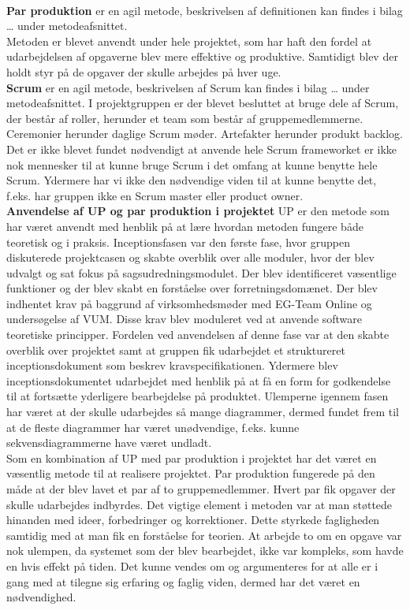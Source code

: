 \\
\textbf{Par produktion} er en agil metode, beskrivelsen af definitionen kan findes i bilag … under metodeafsnittet. \\
Metoden er blevet anvendt under hele projektet, som har haft den fordel at udarbejdelsen af opgaverne blev mere effektive og produktive. Samtidigt blev der holdt styr på de opgaver der skulle arbejdes på hver uge. 
\\ 
\textbf{Scrum} er en agil metode, beskrivelsen af Scrum kan findes i bilag … under metodeafsnittet.
I projektgruppen er der blevet besluttet at bruge dele af Scrum, der består af roller, herunder et team som består af gruppemedlemmerne. Ceremonier herunder daglige Scrum møder. Artefakter herunder produkt backlog. Det er ikke blevet fundet nødvendigt at anvende hele Scrum frameworket er ikke nok mennesker til at kunne bruge Scrum i det omfang at kunne benytte hele Scrum. Ydermere har vi ikke den nødvendige viden til at kunne benytte det, f.eks. har gruppen ikke en Scrum master eller product owner. \\
\textbf{Anvendelse af UP og par produktion i projektet}
UP er den metode som har været anvendt med henblik på at lære hvordan metoden fungere både teoretisk og i praksis. Inceptionsfasen var den første fase, hvor gruppen diskuterede projektcasen og skabte overblik over alle moduler, hvor der blev udvalgt og sat fokus på sagsudredningsmodulet. Der blev identificeret væsentlige funktioner og der blev skabt en forståelse over forretningsdomænet.  Der blev indhentet krav på baggrund af virksomhedsmøder med EG-Team Online og undersøgelse af VUM. Disse krav blev moduleret ved at anvende software teoretiske principper. Fordelen ved anvendelsen af denne fase var at den skabte overblik over projektet samt at gruppen fik udarbejdet et struktureret inceptionsdokument som beskrev kravspecifikationen. Ydermere blev inceptionsdokumentet udarbejdet med henblik på at få en form for godkendelse til at fortsætte yderligere bearbejdelse på produktet. Ulemperne igennem fasen har været at der skulle udarbejdes så mange diagrammer, dermed fundet frem til at de fleste diagrammer har været unødvendige, f.eks. kunne sekvensdiagrammerne have været undladt. \\
Som en kombination af UP med par produktion i projektet har det været en væsentlig metode til at realisere projektet. Par produktion fungerede på den måde at der blev lavet et par af to gruppemedlemmer. Hvert par fik opgaver der skulle udarbejdes indbyrdes. Det vigtige element i metoden var at man støttede hinanden med ideer, forbedringer og korrektioner. Dette styrkede fagligheden samtidig med at man fik en forståelse for teorien. At arbejde to om en opgave var nok ulempen, da systemet som der blev bearbejdet, ikke var kompleks, som havde en hvis effekt på tiden. Det kunne vendes om og argumenteres for at alle er i gang med at tilegne sig erfaring og faglig viden, dermed har det været en nødvendighed. 
